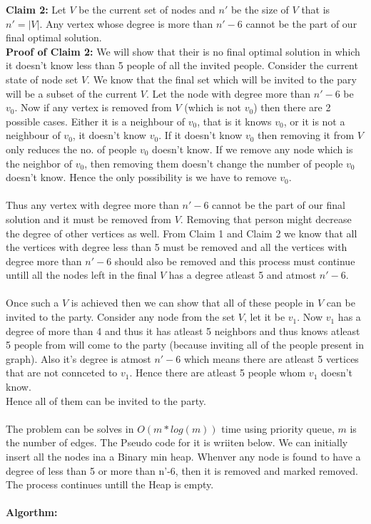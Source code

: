 \documentclass{article}
\begin{document}
\textbf{Claim 2:} Let $V$ be the current set of nodes and $n'$ be the size of $V$ that is $n'= |V|$. Any vertex whose degree is more than $n'-6$ cannot be the part of our final optimal solution.\\
\textbf{Proof of Claim 2:} We will show that their is no final optimal solution in which it doesn't know less than 5 people of all the invited people. Consider the current state of node set $V$. We know that the final set which will be invited to the pary will be a subset of the current $V$. Let the node with degree more than $n'-6$ be $v_0$. Now if any vertex is removed from $V$ (which is not $v_0$) then there are 2 possible cases. Either it is a neighbour of $v_0$, that is it knows $v_0$, or it is not a neighbour of $v_0$, it doesn't know $v_0$. If it doesn't know $v_0$ then removing it from $V$ only reduces the no. of people $v_0$ doesn't know. If we remove any node which is the neighbor of $v_0$, then removing them doesn't change the number of people $v_0$ doesn't know. Hence the only possibility is we have to remove $v_0$.
\\\\
Thus any vertex with degree more than $n'-6$ cannot be the part of our final solution and it must be removed from $V$. Removing that person might decrease the degree of other vertices as well. From Claim 1 and Claim 2 we know that all the vertices with degree less than 5 must be removed and all the vertices with degree more than $n'-6$ should also be removed and this process must continue untill all the nodes left in the final $V$ has a degree atleast 5 and atmost $n'-6$. 
\\\\
Once such a $V$ is achieved then we can show that all of these people in $V$ can be invited to the party. Consider any node from the set $V$, let it be $v_1$. Now $v_1$ has a degree of more than 4 and thus it has atleast 5 neighbors and thus knows atleast 5 people from will come to the party (because inviting all of the people present in graph). Also it's degree is atmost $n'-6$ which means there are atleast 5 vertices that are not connceted to $v_1$. Hence there are atleast 5 people whom $v_1$ doesn't know.\\Hence all of them can be invited to the party.
\\\\
The problem can be solves in $O(m*log(m))$ time using priority queue, $m$ is the number of edges. The Pseudo code for it is wriiten below. We can initially insert all the nodes ina a Binary min heap. Whenver any node is found to have a degree of less than 5 or more than n'-6, then it is removed and marked removed. The process continues untill the Heap is empty.
\\\\
\textbf{Algorthm:}
\end{document}
